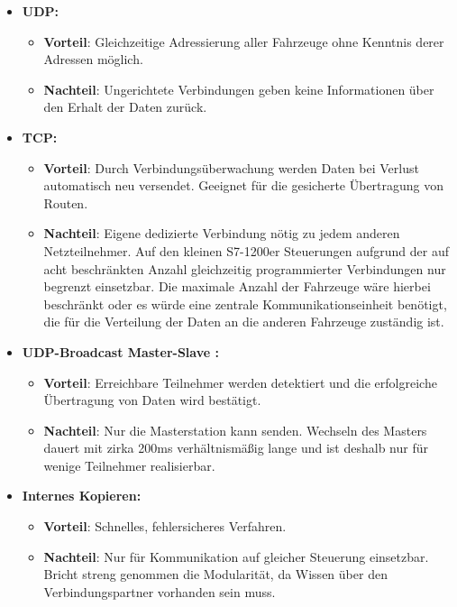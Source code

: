 		\begin{itemize}
			\item \textbf{\ac{UDP}:} 
				\begin{itemize}
					\item \textbf{Vorteil}: Gleichzeitige Adressierung aller Fahrzeuge ohne Kenntnis derer Adressen möglich.
					\item \textbf{Nachteil}: Ungerichtete Verbindungen geben keine Informationen über den Erhalt der Daten zurück.
				\end{itemize}
			\item \textbf{\acs{TCP}:}
				\begin{itemize}
					\item \textbf{Vorteil}: Durch Verbindungsüberwachung werden Daten bei Verlust automatisch neu versendet. Geeignet für die gesicherte Übertragung von Routen.
					\item \textbf{Nachteil}: Eigene dedizierte Verbindung nötig zu jedem anderen Netzteilnehmer. Auf den kleinen S7-1200er Steuerungen aufgrund der auf acht beschränkten Anzahl gleichzeitig programmierter Verbindungen \cite{S7-1200} nur begrenzt einsetzbar. Die maximale Anzahl der Fahrzeuge wäre hierbei beschränkt oder es würde eine zentrale Kommunikationseinheit benötigt, die für die Verteilung der Daten an die anderen Fahrzeuge zuständig ist.
				\end{itemize}
			\item \textbf{\ac{UDP}-Broadcast Master-Slave \cite{MasterSlaveUDP}:}
				\begin{itemize}
					\item \textbf{Vorteil}: Erreichbare Teilnehmer werden detektiert und die erfolgreiche Übertragung von Daten wird bestätigt.
					\item \textbf{Nachteil}: Nur die Masterstation kann senden. Wechseln des Masters dauert mit zirka 200ms verhältnismäßig lange und ist deshalb nur für wenige Teilnehmer realisierbar. 
				\end{itemize}
			\item \textbf{Internes Kopieren:}
			\begin{itemize}
				\item \textbf{Vorteil}: Schnelles, fehlersicheres Verfahren.
				\item \textbf{Nachteil}: Nur für Kommunikation auf gleicher Steuerung einsetzbar. Bricht streng genommen die Modularität, da Wissen über den Verbindungspartner vorhanden sein muss.
			\end{itemize}
		\end{itemize}
		
